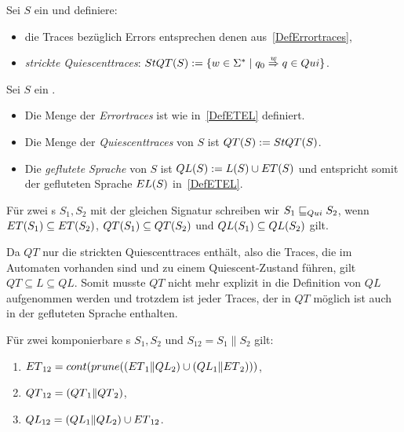\begin{Def}
  \label{DefQuiescenttraces}
  Sei $S$ ein \EIO{} und definiere:
  \begin{itemize}
    \item die Traces bezüglich Errors entsprechen denen
      aus~\ref{DefErrortraces},
    \item \emph{strickte Quiescenttraces}: $StQT{}(S) := \{w\in\Sigma ^*\mid q_0
      \overset{w}{\Rightarrow} q\in Qui\}$.
  \end{itemize}
\end{Def}

\begin{Def}
  \label{DefQTQL}
  Sei $S$ ein \EIO{}.
  \begin{itemize}
    \item Die Menge der \emph{Errortraces} ist wie in~\ref{DefETEL} definiert.
    \item Die Menge der \emph{Quiescenttraces} von $S$ ist $QT{}(S) := StQT{}(S)$.
    \item Die \emph{geflutete Sprache} von $S$ ist $QL{}(S):=L(S)\cup ET{}(S)$
      und entspricht somit der gefluteten Sprache $EL{}(S)$ in~\ref{DefETEL}.
  \end{itemize}
  Für zwei \EIO{}s $S_1, S_2$ mit der gleichen Signatur schreiben wir
  $S_1\sqsubseteq _{Qui} S_2$, wenn $ET{}(S_1)\subseteq ET{}(S_2)$,
  $QT{}(S_1)\subseteq QT{}(S_2)$ und $QL{}(S_1)\subseteq QL{}(S_2)$ gilt.
\end{Def}

Da $QT$ nur die strickten Quiescenttraces enthält, also die Traces, die im
Automaten vorhanden sind und zu einem Quiescent-Zustand führen, gilt
$QT\subseteq L\subseteq QL$. Somit musste $QT$ nicht mehr explizit in die
Definition von $QL$ aufgenommen werden und trotzdem ist jeder Traces, der in
$QT$ möglich ist auch in der gefluteten Sprache enthalten.

\begin{satz}
  \label{satzQuiSemantik}
  Für zwei komponierbare \EIO{}s $S_1, S_2$ und $S_{12} = S_1\|S_2$ gilt:
  \begin{enumerate}
    \item $ET{}_{12} = cont{}(prune{}((ET{}_1\|QL{}_2)\cup (QL{}_1\|ET{}_2)))$,
    \item $QT{}_{12} = (QT{}_1\|QT{}_2)$,%
    \item $QL{}_{12} = (QL{}_1\|QL{}_2)\cup ET{}_{12}$.%
  \end{enumerate}
\end{satz}

